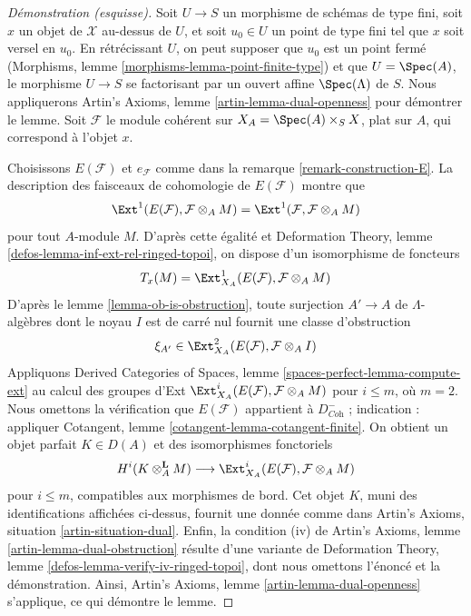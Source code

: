 \begin{proof}[Démonstration (esquisse)]
Soit $U \to S$ un morphisme de schémas de type fini, soit $x$ un objet de
$\mathcal{X}$ au-dessus de $U$, et soit $u_0 \in U$ un point de type fini tel
que $x$ soit versel en $u_0$. En rétrécissant $U$, on peut supposer que $u_0$
est un point fermé (Morphisms, lemme
\ref{morphisms-lemma-point-finite-type}) et que $U = \Spec(A)$, le morphisme
$U \to S$ se factorisant par un ouvert affine $\Spec(\Lambda)$ de $S$.
Nous appliquerons Artin's Axioms, lemme \ref{artin-lemma-dual-openness} pour
démontrer le lemme. Soit $\mathcal{F}$ le module cohérent sur
$X_A = \Spec(A) \times_S X$, plat sur $A$, qui correspond à l'objet $x$.

\medskip\noindent
Choisissons $E(\mathcal{F})$ et $e_\mathcal{F}$ comme dans
la remarque \ref{remark-construction-E}.
La description des faisceaux de cohomologie de $E(\mathcal{F})$ montre que
$$
\Ext^1(E(\mathcal{F}), \mathcal{F} \otimes_A M) =
\Ext^1(\mathcal{F}, \mathcal{F} \otimes_A M)
$$
pour tout $A$-module $M$. D'après cette égalité et
Deformation Theory, lemme \ref{defos-lemma-inf-ext-rel-ringed-topoi},
on dispose d'un isomorphisme de foncteurs
$$
T_x(M) = \Ext^1_{X_A}(E(\mathcal{F}), \mathcal{F} \otimes_A M)
$$
D'après le lemme \ref{lemma-ob-is-obstruction}, toute surjection $A' \to A$
de $\Lambda$-algèbres dont le noyau $I$ est de carré nul fournit une classe
d'obstruction
$$
\xi_{A'} \in \Ext^2_{X_A}(E(\mathcal{F}), \mathcal{F} \otimes_A I)
$$
Appliquons Derived Categories of Spaces, lemme
\ref{spaces-perfect-lemma-compute-ext} au calcul des groupes d'Ext
$\Ext^i_{X_A}(E(\mathcal{F}), \mathcal{F} \otimes_A M)$
pour $i \leq m$, où $m = 2$. Nous omettons la vérification que
$E(\mathcal{F})$ appartient à $D^-_{\textit{Coh}}$ ; indication : appliquer
Cotangent, lemme \ref{cotangent-lemma-cotangent-finite}.
On obtient un objet parfait $K \in D(A)$ et des isomorphismes fonctoriels
$$
H^i(K \otimes_A^\mathbf{L} M)
\longrightarrow
\Ext^i_{X_A}(E(\mathcal{F}), \mathcal{F} \otimes_A M)
$$
pour $i \leq m$, compatibles aux morphismes de bord. Cet objet $K$, muni des
identifications affichées ci-dessus, fournit une donnée comme dans
Artin's Axioms, situation \ref{artin-situation-dual}.
Enfin, la condition (iv) de
Artin's Axioms, lemme \ref{artin-lemma-dual-obstruction}
résulte d'une variante de
Deformation Theory, lemme \ref{defos-lemma-verify-iv-ringed-topoi},
dont nous omettons l'énoncé et la démonstration.
Ainsi, Artin's Axioms, lemme \ref{artin-lemma-dual-openness}
s'applique, ce qui démontre le lemme.
\end{proof}

